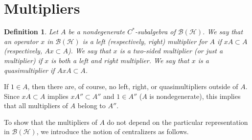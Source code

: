 \documentclass{book}
\newtheorem{definition}{Definition}[section]
\begin{document}
\section{Multipliers}\label{section:centralizers}
\begin{definition}
  Let \(A\) be a nondegenerate \(C^*\)-subalgebra of \(\mathcal{B}(\mathcal{H})\).
  We say that an operator \(x\) in \(\mathcal{B}(\mathcal{H})\) is a \textnormal{left} (respectively, \textnormal{right})
   \textnormal{multiplier} for \(A\) if \(xA\subset A\) (respectively, \(Ax\subset A\)).
   We say that \(x\) is a \textnormal{two-sided multiplier} (or just a \textnormal{multiplier}) if \(x\) is both 
   a left and right multiplier. We say that \(x\) is a \textnormal{quasimultiplier} if \(AxA\subset A\).
\end{definition}

If \(1\in A\), then there are, of course, no left, right, or quasimultipliers outside of \(A\).
Since \(xA\subset A\) implies \(x A''\subset A''\) and \(1\in A''\) (\(A\) is nondegenerate), this implies that all multipliers of \(A\) belong to \(A''\).\par
To show that the multipliers of \(A\) do not depend on the particular representation in \(\mathcal{B}(\mathcal{H})\), we introduce the 
notion of centralizers as follows.
\end{document}
